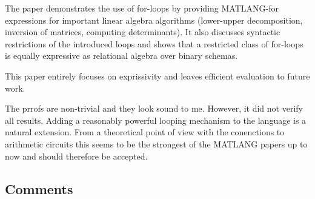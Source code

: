\documentclass[a4paper]{article}
\begin{document}
The paper demonstrates the use of for-loops by providing MATLANG-for
expressions for important linear algebra algorithms (lower-upper decomposition,
inversion of matrices, computing determinants). It also discusses syntactic
restrictions of the introduced loops and shows that a restricted class of
for-loops is equally expressive as relational algebra over binary schemas.

This paper entirely focuses on exprissivity and leaves efficient evaluation to
future work.

The prrofs are non-trivial and they look sound to me. However, it did not verify
all results. Adding a reasonably powerful looping mechanism to the language is   
a natural extension. From a theoretical point of view with the conenctions to
arithmetic circuits this seems to be the strongest of the MATLANG papers up to
now and should therefore be accepted.

\subsection*{Comments}
\end{document}
